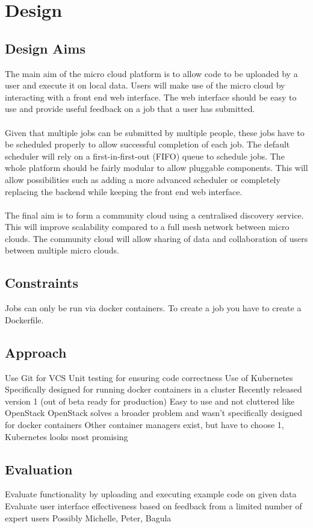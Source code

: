 \documentclass{sig-alternate-05-2015}
\begin{document}
\section{Design}
\subsection{Design Aims}
The main aim of the micro cloud platform is to allow code to be uploaded by a user and execute it on local data. Users will make use of the micro cloud by interacting with a front end web interface. The web interface should be easy to use and provide useful feedback on a job that a user has submitted. 
\\\\
Given that multiple jobs can be submitted by multiple people, these jobs have to be scheduled properly to allow successful completion of each job. The default scheduler will rely on a first-in-first-out (FIFO) queue to schedule jobs. The whole platform should be fairly modular to allow pluggable components. This will allow possibilities such as adding a more advanced scheduler or completely replacing the backend while keeping the front end web interface.
\\\\
The final aim is to form a community cloud using a centralised discovery service. This will improve scalability compared to a full mesh network between micro clouds. The community cloud will allow sharing of data and collaboration of users between multiple micro clouds.

\subsection{Constraints}
Jobs can only be run via docker containers. To create a job you have to create a Dockerfile.
\subsection{Approach}
Use Git for VCS
Unit testing for ensuring code correctness
Use of Kubernetes
Specifically designed for running docker containers in a cluster
Recently released version 1 (out of beta ready for production)
Easy to use and not cluttered like OpenStack
OpenStack solves a broader problem and wasn’t specifically designed for docker containers
Other container managers exist, but have to choose 1, Kubernetes looks most promising
\subsection{Evaluation}
Evaluate functionality by uploading and executing example code on given data
Evaluate user interface effectiveness based on feedback from a limited number of expert users
Possibly Michelle, Peter, Bagula
\end{document}
